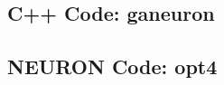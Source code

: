 

\subsection{C++ Code: \textsf{ganeuron}}

\subsection{NEURON Code: \textsf{opt4}}



\clearpage


